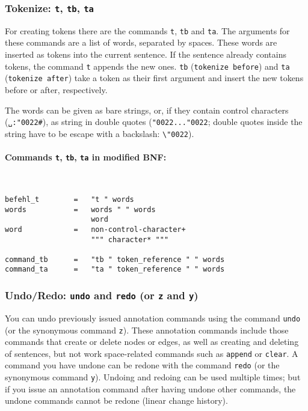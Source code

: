 \documentclass[12pt]{scrartcl}
\newcommand{\quo}{\char"0022}
\begin{document}
\subsubsection{Tokenize: \texttt{t}, \texttt{tb}, \texttt{ta}}

For creating tokens there are the commands \texttt{t}, \texttt{tb} and \texttt{ta}.
The arguments for these commands are a list of words, separated by spaces.
These words are inserted as tokens into the current sentence.
If the sentence already contains tokens, the command \texttt{t} appends the new ones.
\texttt{tb} (\texttt{tokenize before}) and \texttt{ta} (\texttt{tokenize after}) take a token as their first argument and insert the new tokens before or after, respectively.

The words can be given as bare strings, or, if they contain control characters (\texttt{␣:\quo\#}), as string in double quotes (\texttt{\quo...\quo}; double quotes inside the string have to be escape with a backslash: \texttt{\textbackslash\quo}).

\paragraph*{Commands \texttt{t}, \texttt{tb}, \texttt{ta} in modified BNF:}
~
\begin{framed}
\begin{lstlisting}
befehl_t        =   "t " words
words           =   words " " words
                    word
word            =   non-control-character+
                    """ character* """

command_tb      =   "tb " token_reference " " words
command_ta      =   "ta " token_reference " " words
\end{lstlisting}
\end{framed}


\subsubsection{Undo/Redo: \texttt{undo} and \texttt{redo} (or \texttt{z} and \texttt{y})}\label{befehl-undo}

You can undo previously issued annotation commands using the command \texttt{undo} (or the synonymous command \texttt{z}).
These annotation commands include those commands that create or delete nodes or edges, as well as creating and deleting of sentences, but not work space-related commands such as \texttt{append} or \texttt{clear}.
A command you have undone can be redone with the command \texttt{redo} (or the synonymous command \texttt{y}).
Undoing and redoing can be used multiple times; but if you issue an annotation command after having undone other commands, the undone commands cannot be redone (linear change history).
\end{document}
